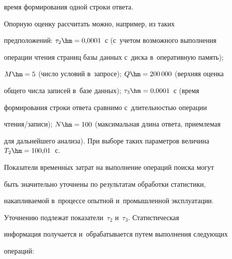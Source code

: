 время формирования одной строки ответа.





      Опорную оценку рассчитать можно, например, из таких 


предположений: $\tau_2\hm=0{,}0001$~с (с~учетом возможного выполнения 


операции чтения страниц базы данных с~диска в~оперативную память); 


$M\hm=5$ (число условий в~запросе); $Q \hm= 200\,000$ (верхняя оценка 


общего числа записей в~базе данных); $\tau_3\hm=0{,}0001$~с (время 


формирования строки ответа сравнимо с~длительностью операции  


чте\-ния\!/\!за\-пи\-си); $N \hm= 100$ (максимальная длина ответа, приемлемая 


для дальнейшего анализа). При выборе таких параметров величина $T_2\hm=  


100{,}01$~с.


      


      Показатели временн$\acute{\mbox{ы}}$х затрат на выполнение операций поиска могут 


быть значительно уточнены по результатам обработки статистики, 


накапливаемой в~процессе опытной и~промышленной эксплуатации. 


Уточнению подлежат показатели~$\tau_2$ и~$\tau_3$. Статистическая 


информация получается и~обрабатывается путем выполнения следующих 


операций:


